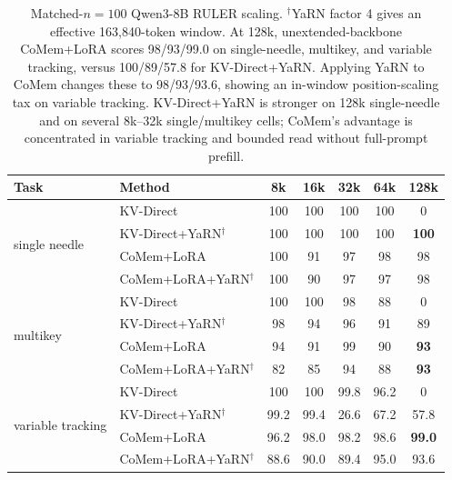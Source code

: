 \begin{table}[!t]
\centering
\small
\setlength{\tabcolsep}{3.8pt}
\begin{tabular}{@{}llccccc@{}}
\toprule
\textbf{Task} & \textbf{Method} & \textbf{8k} & \textbf{16k} & \textbf{32k} & \textbf{64k} & \textbf{128k} \\
\midrule
\multirow{4}{*}{single needle}
& KV-Direct & 100 & 100 & 100 & 100 & 0 \\
& KV-Direct+YaRN$^\dagger$ & 100 & 100 & 100 & 100 & \textbf{100} \\
& CoMem+LoRA & 100 & 91 & 97 & 98 & 98 \\
& CoMem+LoRA+YaRN$^\dagger$ & 100 & 90 & 97 & 97 & 98 \\
\midrule
\multirow{4}{*}{multikey}
& KV-Direct & 100 & 100 & 98 & 88 & 0 \\
& KV-Direct+YaRN$^\dagger$ & 98 & 94 & 96 & 91 & 89 \\
& CoMem+LoRA & 94 & 91 & 99 & 90 & \textbf{93} \\
& CoMem+LoRA+YaRN$^\dagger$ & 82 & 85 & 94 & 88 & \textbf{93} \\
\midrule
\multirow{4}{*}{variable tracking}
& KV-Direct & 100 & 100 & 99.8 & 96.2 & 0 \\
& KV-Direct+YaRN$^\dagger$ & 99.2 & 99.4 & 26.6 & 67.2 & 57.8 \\
& CoMem+LoRA & 96.2 & 98.0 & 98.2 & 98.6 & \textbf{99.0} \\
& CoMem+LoRA+YaRN$^\dagger$ & 88.6 & 90.0 & 89.4 & 95.0 & 93.6 \\
\bottomrule
\end{tabular}
\caption{Matched-$n{=}100$ Qwen3-8B RULER scaling. $^\dagger$YaRN factor 4
gives an effective 163,840-token window. At 128k, unextended-backbone CoMem+LoRA scores
98/93/99.0 on single-needle, multikey, and variable tracking, versus
100/89/57.8 for KV-Direct+YaRN. Applying YaRN to CoMem changes these to
98/93/93.6, showing an in-window position-scaling tax on variable tracking.
KV-Direct+YaRN is stronger on 128k single-needle and on several 8k--32k
single/multikey cells; CoMem's advantage is concentrated in variable tracking
and bounded read without full-prompt prefill.}
\label{tab:scaling}
\end{table}
